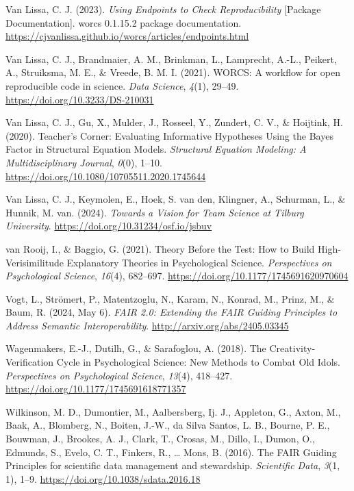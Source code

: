 \documentclass[
  man, noextraspace,floatsintext]{apa7}
\newlength{\cslhangindent}
\newenvironment{CSLReferences}[2] %
 {\begin{list}{}{%
  \setlength{\itemindent}{0pt}
  \setlength{\leftmargin}{0pt}
  \setlength{\parsep}{0pt}
  \ifodd #1
   \setlength{\leftmargin}{\cslhangindent}
   \setlength{\itemindent}{-1\cslhangindent}
  \fi
  \setlength{\itemsep}{#2\baselineskip}}}
 {\end{list}}
\begin{document}
\begin{CSLReferences}{1}{0}
Van Lissa, C. J. (2023). \emph{Using {Endpoints} to {Check Reproducibility}} {[}Package Documentation{]}. worcs 0.1.15.2 package documentation. \url{https://cjvanlissa.github.io/worcs/articles/endpoints.html}

Van Lissa, C. J., Brandmaier, A. M., Brinkman, L., Lamprecht, A.-L., Peikert, A., Struiksma, M. E., \& Vreede, B. M. I. (2021). {WORCS}: {A} workflow for open reproducible code in science. \emph{Data Science}, \emph{4}(1), 29--49. \url{https://doi.org/10.3233/DS-210031}

Van Lissa, C. J., Gu, X., Mulder, J., Rosseel, Y., Zundert, C. V., \& Hoijtink, H. (2020). Teacher's {Corner}: {Evaluating Informative Hypotheses Using} the {Bayes Factor} in {Structural Equation Models}. \emph{Structural Equation Modeling: A Multidisciplinary Journal}, \emph{0}(0), 1--10. \url{https://doi.org/10.1080/10705511.2020.1745644}

Van Lissa, C. J., Keymolen, E., Hoek, S. van den, Klingner, A., Schurman, L., \& Hunnik, M. van. (2024). \emph{Towards a {Vision} for {Team Science} at {Tilburg University}}. \url{https://doi.org/10.31234/osf.io/jsbuv}

van Rooij, I., \& Baggio, G. (2021). Theory {Before} the {Test}: {How} to {Build High-Verisimilitude Explanatory Theories} in {Psychological Science}. \emph{Perspectives on Psychological Science}, \emph{16}(4), 682--697. \url{https://doi.org/10.1177/1745691620970604}

Vogt, L., Strömert, P., Matentzoglu, N., Karam, N., Konrad, M., Prinz, M., \& Baum, R. (2024, May 6). \emph{{FAIR} 2.0: {Extending} the {FAIR Guiding Principles} to {Address Semantic Interoperability}}. \url{http://arxiv.org/abs/2405.03345}

Wagenmakers, E.-J., Dutilh, G., \& Sarafoglou, A. (2018). The {Creativity-Verification Cycle} in {Psychological Science}: {New Methods} to {Combat Old Idols}. \emph{Perspectives on Psychological Science}, \emph{13}(4), 418--427. \url{https://doi.org/10.1177/1745691618771357}

Wilkinson, M. D., Dumontier, M., Aalbersberg, Ij. J., Appleton, G., Axton, M., Baak, A., Blomberg, N., Boiten, J.-W., da Silva Santos, L. B., Bourne, P. E., Bouwman, J., Brookes, A. J., Clark, T., Crosas, M., Dillo, I., Dumon, O., Edmunds, S., Evelo, C. T., Finkers, R., \ldots{} Mons, B. (2016). The {FAIR Guiding Principles} for scientific data management and stewardship. \emph{Scientific Data}, \emph{3}(1, 1), 1--9. \url{https://doi.org/10.1038/sdata.2016.18}


\end{CSLReferences}
\end{document}
